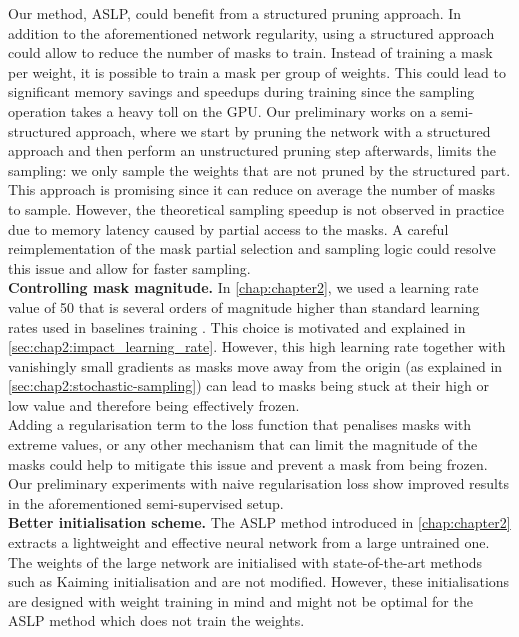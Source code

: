 Our method, \acf{ASLP}, could benefit from a structured pruning approach. In
addition to the aforementioned network regularity, using a structured approach
could allow to reduce the number of masks to train. Instead of training a mask
per weight, it is possible to train a mask per group of weights. This could lead
to significant memory savings and speedups during training since the sampling
operation takes a heavy toll on the \ac{GPU}. Our preliminary works on a
semi-structured approach, where we start by pruning the network with a
structured approach and then perform an unstructured pruning step afterwards,
limits the sampling: we only sample the weights that are not pruned by the
structured part. This approach is promising since it can reduce on average the
number of masks to sample. However, the theoretical sampling speedup is not
observed in practice due to memory latency caused by partial access to the
masks. A careful reimplementation of the mask partial selection and sampling
logic could resolve this issue and allow for faster sampling.\\


\noindent \textbf{Controlling mask magnitude.} In \cref{chap:chapter2}, we used
a learning rate value of 50 that is several orders of magnitude higher than
standard learning rates used in baselines training \cite{nvidia-baselines}. This
choice is motivated and explained in \cref{sec:chap2:impact_learning_rate}.
However, this high learning rate together with vanishingly small gradients as
masks move away from the origin (as explained in
\cref{sec:chap2:stochastic-sampling}) can lead to masks being stuck at their
high or low value and therefore being effectively frozen. \\

Adding a regularisation term to the loss function that penalises masks with
extreme values, or any other mechanism that can limit the magnitude of the masks
could help to mitigate this issue and prevent a mask from being frozen. Our
preliminary experiments with naive regularisation loss show improved results in
the aforementioned semi-supervised setup.\\


\noindent \textbf{Better initialisation scheme.} The \ac{ASLP} method introduced
in \cref{chap:chapter2} extracts a lightweight and effective neural network from
a large untrained one. The weights of the large network are initialised with
state-of-the-art methods such as Kaiming initialisation
\cite{DBLP:conf/iccv/HeZRS15} and are not modified. However, these
initialisations are designed with weight training in mind and might not be
optimal for the \ac{ASLP} method which does not train the weights.\\

